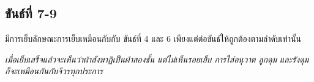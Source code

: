 \subsection{ขันธ์ที่ 7-9}

มีการเย็บลักษณะการเย็บเหมือนกับกับ ขันธ์ที่ 4 และ 6
เพียงแต่ต่อขันธ์ให้ถูกต้องตามลำดับเท่านั้น

\emph{เมื่อเย็บเสร็จแล้วจะเห็นว่าผ้าสังฆาฏิเป็นผ้าสองชั้น
แต่ไม่เห็นรอยเย็บ การใส่อนุวาต ลูกดุม และรังดุม
ก็จะเหมือนกันกับจีวรทุกประการ}

